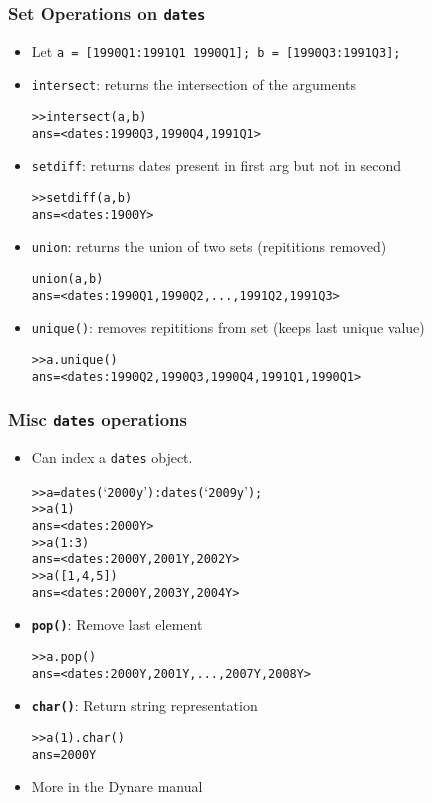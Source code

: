 \documentclass[10pt]{beamer}
\newcommand{\myitem}{\item[$\bullet$]}
\begin{document}
\begin{frame}[fragile,t]
  \frametitle{Set Operations on \texttt{dates}}
  \begin{itemize}
    \myitem Let \texttt{a = [1990Q1:1991Q1 1990Q1]; b = [1990Q3:1991Q3];}
    \myitem \texttt{intersect}: returns the intersection of the arguments
    \begin{alltt}
  >> intersect(a, b)
  ans = <dates: 1990Q3, 1990Q4, 1991Q1>
    \end{alltt}
    \myitem \texttt{setdiff}: returns dates present in first arg but not in second
    \begin{alltt}
  >> setdiff(a, b)
  ans = <dates: 1900Y>
    \end{alltt}
    \myitem \texttt{union}: returns the union of two sets (repititions removed)
    \begin{alltt}
  union(a, b)
  ans = <dates: 1990Q1, 1990Q2,  ..., 1991Q2, 1991Q3>
    \end{alltt}
    \myitem \texttt{unique()}: removes repititions from set (keeps last unique value)
    \begin{alltt}
  >> a.unique()
  ans = <dates: 1990Q2, 1990Q3, 1990Q4, 1991Q1, 1990Q1>
    \end{alltt}
  \end{itemize}
\end{frame}



\begin{frame}[fragile,t]
  \frametitle{Misc \texttt{dates} operations}
  \begin{itemize}
    \myitem Can index a \texttt{dates} object.
    \begin{alltt}
  >> a = dates(`2000y'):dates(`2009y');
  >> a(1)
  ans = <dates: 2000Y>
  >> a(1:3)
  ans = <dates: 2000Y, 2001Y, 2002Y>
  >> a([1,4,5])
  ans = <dates: 2000Y, 2003Y, 2004Y>
    \end{alltt}
    \myitem{\textbf{\texttt{pop()}}}: Remove last element
    \begin{alltt}
  >> a.pop()
  ans = <dates: 2000Y, 2001Y,  ..., 2007Y, 2008Y>
    \end{alltt}
    \myitem{\textbf{\texttt{char()}}}: Return string representation
    \begin{alltt}
  >> a(1).char()
  ans = 2000Y
    \end{alltt}
    \myitem More in the Dynare manual
  \end{itemize}
\end{frame}


%
%
\end{document}
